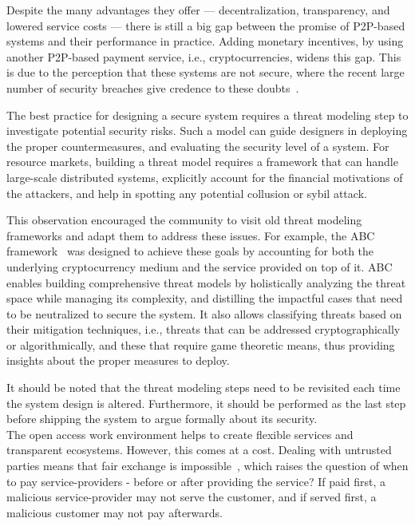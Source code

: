 \documentclass{llncs}
\begin{document}
 Despite the many advantages they offer — decentralization, transparency, and lowered service costs — there is still a big gap between the promise of P2P-based systems and their performance in practice. Adding monetary incentives, by using another P2P-based payment service, i.e., cryptocurrencies, widens this gap. This is due to the perception that these systems are not secure, where the recent large number of security breaches give credence to these doubts~\cite{benebit-scam,binance-hack,bitcoin-cash-hack,bitcoingold-double-spending,exchange-hack-b,bitfloor-hack,korea-exchange-hack,eth-hack,ico-hack-b,exchange-hack,enigma-hack,mine-hack}.


The best practice for designing a secure system requires a threat modeling step to investigate potential security risks. Such a model can guide designers in deploying the proper countermeasures, and evaluating the security level of a system. For resource markets, building a threat model requires a framework that can handle large-scale distributed systems, explicitly account for the financial motivations of the attackers, and help in spotting any potential collusion or sybil attack.


This observation encouraged the community to visit old threat modeling frameworks and adapt them to address these issues. For example, the ABC framework~\cite{Almashaqbeh19} was designed to achieve these goals by accounting for both the underlying cryptocurrency medium and the service provided on top of it. ABC enables building comprehensive threat models by holistically analyzing the threat space while managing its complexity, and distilling the impactful cases that need to be neutralized to secure the system. It also allows classifying threats based on their mitigation techniques, i.e., threats that can be addressed cryptographically or algorithmically, and these that require game theoretic means, thus providing insights about the proper measures to deploy.


It should be noted that the threat modeling steps need to be revisited each time the system design is altered. Furthermore, it should be performed as the last step before shipping the system to argue formally about its security.  \\


 The open access work environment helps to create flexible services and transparent ecosystems. However, this comes at a cost. Dealing with untrusted parties means that fair exchange is impossible~\cite{Even80,Pagnia99}, which raises the question of when to pay service-providers - before or after providing the service? If paid first, a malicious service-provider may not serve the customer, and if served first, a malicious customer may not pay afterwards.
\end{document}

